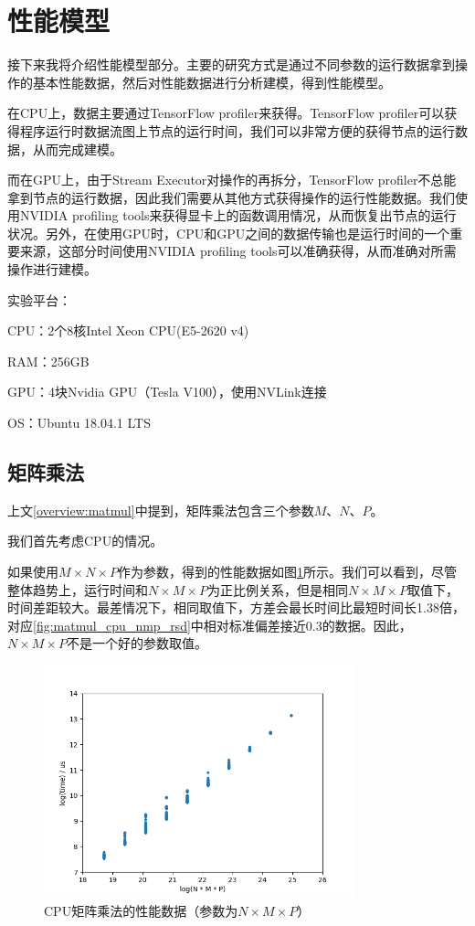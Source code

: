 \section{性能模型}
\label{sec:impl_model}
    接下来我将介绍性能模型部分。主要的研究方式是通过不同参数的运行数据拿到操作的基本性能数据，然后对性能数据进行分析建模，得到性能模型。
    
    在CPU上，数据主要通过TensorFlow profiler来获得。TensorFlow profiler可以获得程序运行时数据流图上节点的运行时间，我们可以非常方便的获得节点的运行数据，从而完成建模。
    
    而在GPU上，由于Stream Executor对操作的再拆分，TensorFlow profiler不总能拿到节点的运行数据，因此我们需要从其他方式获得操作的运行性能数据。我们使用NVIDIA profiling tools来获得显卡上的函数调用情况，从而恢复出节点的运行状况。另外，在使用GPU时，CPU和GPU之间的数据传输也是运行时间的一个重要来源，这部分时间使用NVIDIA profiling tools可以准确获得，从而准确对所需操作进行建模。
    
    实验平台：

        CPU：2个8核Intel Xeon CPU(E5-2620 v4)

        RAM：256GB

        GPU：4块Nvidia GPU（Tesla V100），使用NVLink连接
        
        OS：Ubuntu 18.04.1 LTS

\subsection{矩阵乘法}
    上文\ref{overview:matmul}中提到，矩阵乘法包含三个参数$ M $、$ N $、$ P $。
    
    我们首先考虑CPU的情况。
    
    如果使用$ M \times N \times P $作为参数，得到的性能数据如图\ref{fig:matmul_cpu_nmp}所示。我们可以看到，尽管整体趋势上，运行时间和$ N \times M \times P $为正比例关系，但是相同$ N \times M \times P $取值下，时间差距较大。最差情况下，相同取值下，方差会最长时间比最短时间长1.38倍，对应\ref{fig:matmul_cpu_nmp_rsd}中相对标准偏差接近0.3的数据。因此，$ N \times M \times P $不是一个好的参数取值。
    
    \begin{figure}[!htbp]
        \centering
        \includegraphics[width=0.8\textwidth]{figures/matmul_cpu_nmp.png}
        \caption{CPU矩阵乘法的性能数据（参数为$N \times M \times P $）}
        \label{fig:matmul_cpu_nmp}
    \end{figure}
    
